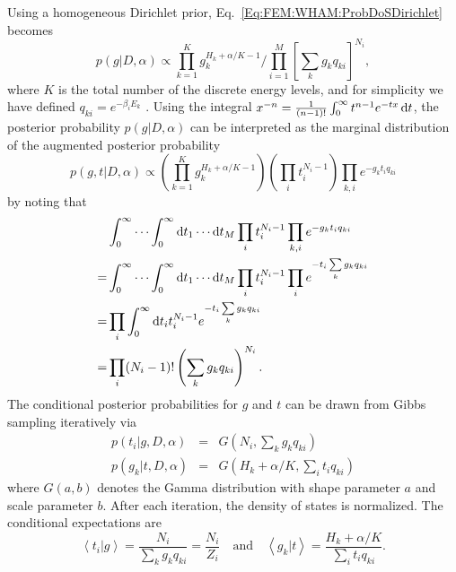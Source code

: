 Using a homogeneous Dirichlet prior, Eq.~\ref{Eq:FEM:WHAM:ProbDoSDirichlet} becomes
\begin{equation}
    p(g|D,\alpha)\propto \prod_{k=1}^Kg_k^{H_k+\alpha/K-1}/\prod_{i=1}^{M}\left[\sum_k g_kq_{ki}\right]^{N_i},
\end{equation}
where $K$ is the total number of the discrete energy levels, and for simplicity we have defined $q_{ki}=e^{-\beta_i E_k}$ . Using the integral $x^{-n}=\frac{1}{(n-1)!}\int_0^\infty t^{n-1}e^{-tx}\mathop{}\!\mathrm{d} t$, the posterior probability $p(g|D,\alpha)$ can be interpreted as the marginal distribution of the augmented posterior probability
\begin{equation}
    p(g,t|D,\alpha)\propto \left(\prod_{k=1}^Kg_k^{H_k+\alpha/K-1}\right)\left(\prod_i t_i^{N_i-1}\right)\prod_{k,i}e^{-g_kt_iq_{ki}}
\end{equation}
by noting that
\begin{align}
     &\int_0^\infty\cdots\int_0^\infty \mathop{}\!\mathrm{d} t_1\cdots\mathop{}\!\mathrm{d} t_M\prod_it_i^{N_i-1}\prod_{k,i}e^{-g_kt_iq_{ki}}\notag\\
    =&\int_0^\infty\cdots\int_0^\infty \mathop{}\!\mathrm{d} t_1\cdots\mathop{}\!\mathrm{d} t_M \prod_it_i^{N_i-1}\prod_i e^{-t_i\sum\limits_k g_kq_{ki}}\notag\\
    =&\prod_i \int_0^\infty \mathop{}\!\mathrm{d} t_i t_i^{N_i-1}e^{-t_i\sum\limits_k g_kq_{ki}}\notag\\
    =&\prod_i (N_i-1)!\left(\sum_k g_kq_{ki}\right)^{N_i}.
\end{align}
The conditional posterior probabilities for $g$ and $t$ can be drawn from Gibbs sampling iteratively via
\begin{subequations}
\begin{eqnarray}
	p(t_i|g,D,\alpha)&=&G(N_i,\sum_k g_kq_{ki})\\
	p(g_k|t,D,\alpha)&=&G(H_k+\alpha/K,\sum_it_iq_{ki})
\end{eqnarray}
\end{subequations}
where $G(a,b)$ denotes the Gamma distribution with shape parameter $a$ and scale parameter $b$. After each iteration, the density of states is normalized. The conditional expectations are
\begin{equation}
    \left<t_i|g\right>=\frac{N_i}{\sum_k g_kq_{ki}}=\frac{N_i}{Z_i}\quad \text{and} \quad \left<g_k|t\right>=\frac{H_k+\alpha/K}{\sum_it_iq_{ki}}.
\end{equation}

